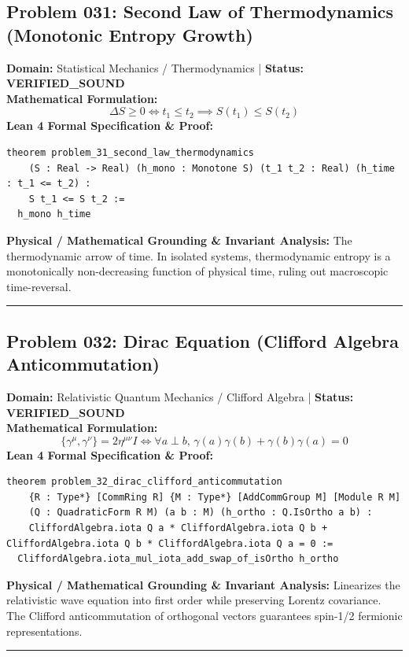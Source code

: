 \documentclass[10pt,a4paper]{article}
\begin{document}
\subsection*{Problem 031: Second Law of Thermodynamics (Monotonic Entropy Growth)}
\textbf{Domain:} Statistical Mechanics / Thermodynamics \quad | \quad \textbf{Status:} \textcolor{green!70!black}{\textbf{VERIFIED\_SOUND}}\\
\textbf{Mathematical Formulation:}
\begin{equation*}
  \Delta S \ge 0 \iff t_1 \le t_2 \implies S(t_1) \le S(t_2)
\end{equation*}
\textbf{Lean 4 Formal Specification \& Proof:}
\begin{lstlisting}
theorem problem_31_second_law_thermodynamics
    (S : Real -> Real) (h_mono : Monotone S) (t_1 t_2 : Real) (h_time : t_1 <= t_2) :
    S t_1 <= S t_2 :=
  h_mono h_time
\end{lstlisting}
\textbf{Physical / Mathematical Grounding \& Invariant Analysis:}
The thermodynamic arrow of time. In isolated systems, thermodynamic entropy is a monotonically non-decreasing function of physical time, ruling out macroscopic time-reversal.
\vspace{0.8em}\hrule\vspace{0.8em}
\subsection*{Problem 032: Dirac Equation (Clifford Algebra Anticommutation)}
\textbf{Domain:} Relativistic Quantum Mechanics / Clifford Algebra \quad | \quad \textbf{Status:} \textcolor{green!70!black}{\textbf{VERIFIED\_SOUND}}\\
\textbf{Mathematical Formulation:}
\begin{equation*}
  \{\gamma^\mu, \gamma^\nu\} = 2 \eta^{\mu\nu} I \iff \forall a \perp b, \, \gamma(a)\gamma(b) + \gamma(b)\gamma(a) = 0
\end{equation*}
\textbf{Lean 4 Formal Specification \& Proof:}
\begin{lstlisting}
theorem problem_32_dirac_clifford_anticommutation
    {R : Type*} [CommRing R] {M : Type*} [AddCommGroup M] [Module R M]
    (Q : QuadraticForm R M) (a b : M) (h_ortho : Q.IsOrtho a b) :
    CliffordAlgebra.iota Q a * CliffordAlgebra.iota Q b + CliffordAlgebra.iota Q b * CliffordAlgebra.iota Q a = 0 :=
  CliffordAlgebra.iota_mul_iota_add_swap_of_isOrtho h_ortho
\end{lstlisting}
\textbf{Physical / Mathematical Grounding \& Invariant Analysis:}
Linearizes the relativistic wave equation into first order while preserving Lorentz covariance. The Clifford anticommutation of orthogonal vectors guarantees spin-1/2 fermionic representations.
\vspace{0.8em}\hrule\vspace{0.8em}
\end{document}

